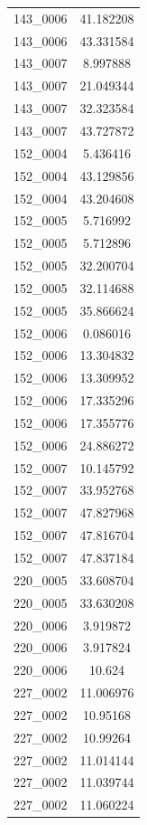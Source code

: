 \begin{table}[H]
\begin{tabular}{|c|c|}
        143\_0006 & 41.182208 \\
        143\_0006 & 43.331584 \\
        143\_0007 & 8.997888 \\
        143\_0007 & 21.049344 \\
        143\_0007 & 32.323584 \\
        143\_0007 & 43.727872 \\
        152\_0004 & 5.436416 \\
        152\_0004 & 43.129856 \\
        152\_0004 & 43.204608 \\
        152\_0005 & 5.716992 \\
        152\_0005 & 5.712896 \\
        152\_0005 & 32.200704 \\
        152\_0005 & 32.114688 \\
        152\_0005 & 35.866624 \\
        152\_0006 & 0.086016 \\
        152\_0006 & 13.304832 \\
        152\_0006 & 13.309952 \\
        152\_0006 & 17.335296 \\
        152\_0006 & 17.355776 \\
        152\_0006 & 24.886272 \\
        152\_0007 & 10.145792 \\
        152\_0007 & 33.952768 \\
        152\_0007 & 47.827968 \\
        152\_0007 & 47.816704 \\
        152\_0007 & 47.837184 \\
        220\_0005 & 33.608704 \\
        220\_0005 & 33.630208 \\
        220\_0006 & 3.919872 \\
        220\_0006 & 3.917824 \\
        220\_0006 & 10.624 \\
        227\_0002 & 11.006976 \\
        227\_0002 & 10.95168 \\
        227\_0002 & 10.99264 \\
        227\_0002 & 11.014144 \\
        227\_0002 & 11.039744 \\
        227\_0002 & 11.060224 \\

\end{tabular}
\end{table}
